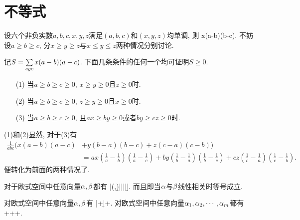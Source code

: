 \section{不等式}
设六个非负实数$a,b,c,x,y,z$满足$(a,b,c)$和$(x,y,z)$均单调, 则
\bee
\sumcyc x(a-b)(b-c).
\eee
\et
\ba
不妨设$a\ge b\ge c$, 分$x\ge y\ge z$与$x\le y\le z$两种情况分别讨论.
\ea

记$S=\sum\limits_{cyc} x(a-b)(a-c)$. 下面几条条件的任何一个均可证明$S\ge0$.
\begin{itemize}
 \item[(1)] 当$a\ge b\ge c\ge 0$, $x\ge y\ge 0$且$z\ge 0$时.
 \item[(2)] 当$a\ge b\ge c\ge 0$, $z\ge y\ge 0$且$x\ge 0$时.
 \item[(3)] 当$a\ge b\ge c\ge 0$, 且$ax\ge by\ge0$或者$by\ge cz\ge 0$时.
\end{itemize}
\ec
\ba
(1)和(2)显然, 对于(3)有
\begin{align*}
\frac{1}{abc}(x(a-b)(a-c) & +y(b-a)(b-c)+z(c-a)(c-b))\\
  & = ax\left(\frac1a-\frac1b\right)\left(\frac1a-\frac1c\right)
  +by\left(\frac1b-\frac1a\right)\left(\frac1b-\frac1c\right)+cz\left(\frac1c-\frac1a\right)\left(\frac1c-\frac1b\right).
\end{align*}
便转化为前面的两种情况了.
\ea

对于欧式空间中任意向量$\alpha,\beta$都有
\bee
|(\a,\b)|\le|\a||\b|.
\eee
而且即当$\alpha$与$\beta$线性相关时等号成立.
\et

对欧式空间中任意向量$\alpha,\beta$有
\bee
|\a+\b|\le\abs{\a}+\abs{\b}.
\eee
对欧式空间中任意向量$\alpha_1,\alpha_2,\cdots,\alpha_m$都有
\bee
{}\le{}++\cdots+.
\eee
\et
